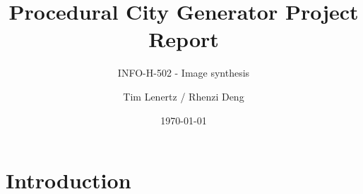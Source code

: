 \documentclass[a4paper,11pt]{scrreprt}
\begin{document}
\titlehead{Université Libre de Bruxelles}
\title{Procedural City Generator Project Report}
\subtitle{INFO-H-502 - Image synthesis}
\author{Tim Lenertz / Rhenzi Deng}
\date{\today}
\maketitle

\tableofcontents

\chapter{Introduction}
\end{document}
